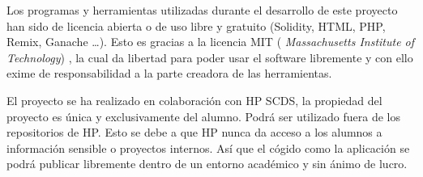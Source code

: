 Los programas y herramientas utilizadas durante el desarrollo de este proyecto han sido de licencia abierta o de uso libre y gratuito (Solidity, HTML, PHP, Remix, Ganache \ldots). Esto es gracias a la licencia MIT ( \textit{Massachusetts Institute of Technology}) \cite{MIT}, la cual da libertad para poder usar el software libremente y con ello exime de responsabilidad a la parte creadora de las herramientas.
	
El proyecto se ha realizado en colaboración con HP SCDS, la propiedad del proyecto es única y exclusivamente del alumno. Podrá ser utilizado fuera de los repositorios de HP. Esto se debe a que HP nunca da acceso a los alumnos a información sensible o proyectos internos. Así que el cógido como la aplicación se podrá publicar libremente dentro de un entorno académico y sin ánimo de lucro.